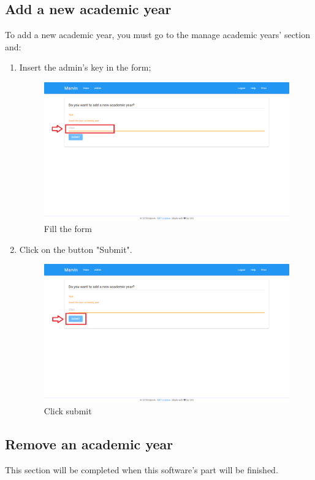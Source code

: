 \documentclass[ManualeUtente]{subfiles}
\begin{document}
\subsection{Add a new academic year}
To add a new academic year, you must go to the manage academic years' section and:
\begin{enumerate}
	\item Insert the admin's key in the form;
	\begin{figure}[H]
		\centering
		\includegraphics[width=0.7\linewidth]{image/UniversityAddYear1}
		\caption[Add year form]{Fill the form}
		\label{fig:universityaddamin}
	\end{figure}
	\item Click on the button "Submit".
	\begin{figure}[H]
		\centering
		\includegraphics[width=0.7\linewidth]{image/UniversityAddYear2}
		\caption[Add year submit]{Click submit}
		\label{fig:universityaddamin}
	\end{figure}
\end{enumerate}

\subsection{Remove an academic year}
This section will be completed when this software's part will be finished.
\end{document}
